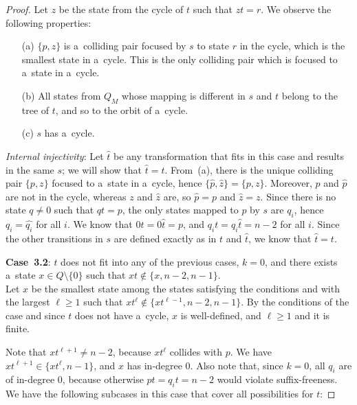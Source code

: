 \documentclass{amsart}
\renewcommand{\ge}{\geqslant}
\newcommand{\e}[1]{\hat{#1}}
\begin{document}
\begin{proof}
Let $z$ be the state from the cycle of $t$ such that $zt = r$. 
We observe the following properties:
\begin{enumerate}
\item[(a)] $\{p,z\}$ is a~colliding pair focused by $s$ to state $r$ in the cycle, which is the smallest state in a~cycle. 
This is the only colliding pair which is focused to a~state in a~cycle.

\item[(b)] All states from $Q_M$ whose mapping is different in $s$ and $t$ belong to the tree of $t$, and so to the orbit of a~cycle.

\item[(c)] $s$ has a~cycle.
\end{enumerate}

\textit{Internal injectivity}:
Let $\e{t}$ be any transformation that fits in this case and results in the same $s$; we will show that $\e{t}=t$.
From~(a), there is the unique colliding pair $\{p,z\}$ focused to a~state in a~cycle, hence $\{\e{p},\e{z}\} = \{p,z\}$.
Moreover, $p$ and $\e{p}$ are not in the cycle, whereas $z$ and $\e{z}$ are, so $\e{p}=p$ and $\e{z}=z$.
Since there is no state $q \neq 0$ such that $qt=p$, the only states mapped to $p$ by $s$ are $q_i$, hence $q_i = \e{q_i}$ for all $i$.
We know that $0t = 0\e{t} = p$, and $q_i t = q_i \e{t} = n-2$ for all $i$.
Since the other transitions in $s$ are defined exactly as in $t$ and $\e{t}$, we know that $\e{t}=t$.

\textbf{Case~3.2}: $t$ does not fit into any of the previous cases, $k=0$, and there exists a~state $x \in Q \setminus \{0\}$ such that $xt \notin \{x,n-2,n-1\}$.\\
Let $x$ be the smallest state among the states satisfying the conditions and with the largest $\ell\ge 1$ such that $xt^\ell \notin \{xt^{\ell-1},n-2,n-1\}$.
By the conditions of the case and since $t$ does not have a~cycle, $x$ is well-defined, and $\ell \ge 1$ and it is finite.

Note that $xt^{\ell+1} \neq n-2$, because $xt^\ell$ collides with $p$.
We have $xt^{\ell+1} \in \{xt^\ell,n-1\}$, and $x$ has in-degree 0.
Also note that, since $k=0$, all $q_i$ are of in-degree 0, because otherwise $pt=q_it=n-2$ would violate suffix-freeness.
We have the following subcases in this case that cover all possibilities for $t$:


\end{proof}
\end{document}
